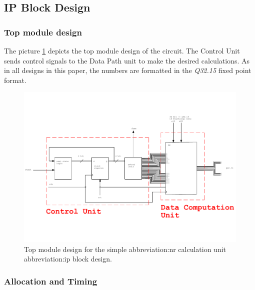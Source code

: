 \documentclass[a4paper, twoside, 11pt]{article}
\newcommand{\fbar}{\FloatBarrier}
\begin{document}
    \subsection{IP Block Design}
        
        \fbar
        \subsubsection{Top module design}
            The picture \ref{fig:simple-nr-top-module} depicts the top module design of the circuit. The Control Unit sends control signals to the Data Path unit to make the desired calculations. As in all designs in this paper, the numbers are formatted in the \textit{Q32.15} fixed point format.
            \begin{figure}[htbp!]
                \centering
                \includegraphics[width=1\textwidth]{src/pdf/simple-nr-top-module.pdf}
                \caption{Top module design for the simple \gls{abbreviation:nr} calculation unit \gls{abbreviation:ip} block design.}
                \label{fig:simple-nr-top-module}
            \end{figure}

        \fbar
        \subsubsection{Allocation and Timing}
            
\end{document}

